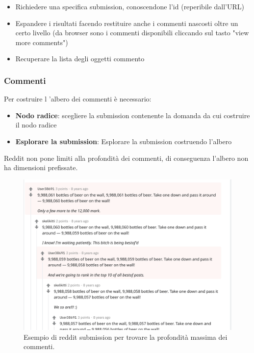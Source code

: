\begin{itemize}
    \item Richiedere una specifica submission, conoscendone l'id (reperibile dall'URL)
    \item Espandere i risultati facendo restituire anche i commenti nascosti oltre un certo livello (da browser sono i commenti disponibili cliccando sul tasto "view more comments")
    \item Recuperare la lista degli oggetti commento
\end{itemize}

\subsubsection {Commenti}
Per costruire l 'albero dei commenti è necessario:

\begin{itemize}
    \item \textbf{Nodo radice}: scegliere la submission contenente la domanda da cui costruire il nodo radice
    \item \textbf{Esplorare la submission}: Esplorare la submission costruendo l'albero
\end{itemize}

Reddit non pone limiti alla profondità dei commenti, di conseguenza l'albero non ha dimensioni prefissate.

\begin{figure}
    \includegraphics[width=\linewidth]{Immagini/reddit-comment-nesting.png}
    \caption{Esempio di reddit submission per trovare la profondità massima dei commenti.}
    \label{fig:reddit-comment-nesting}
\end{figure}



